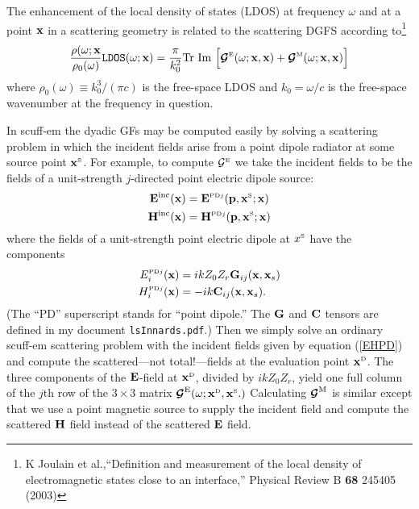 \documentclass[letterpaper]{article}
\begin{document}
The enhancement of the local density of states (LDOS)
at frequency $\omega$ and at a point $\mathbf{x}$ in a 
scattering geometry is related to the scattering DGFS according 
to\footnote{K Joulain et al.,``Definition and measurement of the local 
density of electromagnetic states close to an interface,''
Physical Review B \textbf{68} 245405 (2003)}
$$ \frac{\rho(\omega; \mathbf{x}}{\rho_0(\omega)}
   \texttt{LDOS}(\omega; \mathbf{x}) 
   = 
   \frac{\pi}{k_0^2}\text{Tr }\text{Im }
   \Big[ \boldsymbol{\mathcal{G}}^{\hbox{\tiny{E}}}(\omega; \mathbf{x}, \mathbf{x})
        +\boldsymbol{\mathcal{G}}^{\hbox{\tiny{M}}}(\omega; \mathbf{x}, \mathbf{x})
   \Big]
$$
where $\rho_0(\omega)\equiv k^3_0/(\pi c)$ is the free-space
LDOS and $k_0=\omega/c$ is the free-space wavenumber at the
frequency in question.

In {\sc scuff-em} the dyadic GFs may be computed easily by solving a
scattering problem in which the incident fields arise from a point dipole
radiator at some source point $\mathbf{x}^{\hbox{\tiny{S}}}$. For example, to compute 
$\mathcal{G}^{\hbox{\tiny{E}}}$ we take the incident fields to be the fields of a 
unit-strength $j$-directed point electric dipole source:
\begin{subequations}
\begin{align}
 \mathbf{E}^{\hbox{\scriptsize{inc}}}(\mathbf{x}) &= \mathbf{E}^{\hbox{\tiny{PD$j$}}}(\mathbf{p}, \mathbf{x}^{\hbox{\tiny{S}}}; \mathbf{x})
\\
 \mathbf{H}^{\hbox{\scriptsize{inc}}}(\mathbf{x}) &= \mathbf{H}^{\hbox{\tiny{PD$j$}}}(\mathbf{p}, \mathbf{x}^{\hbox{\tiny{S}}}; \mathbf{x})
\end{align}
\label{EHPD}
\end{subequations}
where the fields of a unit-strength point electric dipole at $x^{\hbox{\tiny{S}}}$
have the components
\begin{subequations}
\begin{align*}
 E_i^{\hbox{\tiny{PD$j$}}}(\mathbf{x}) &= ikZ_0 Z_r \mathbf{G}_{ij}(\mathbf{x}, \mathbf{x}_s) \\
 H_i^{\hbox{\tiny{PD$j$}}}(\mathbf{x}) &= -ik       \mathbf{C}_{ij}(\mathbf{x}, \mathbf{x}_s).
\end{align*}
\label{PDFields}
\end{subequations}
(The ``PD'' superscript stands for ``point dipole.'' The $\mathbf{G}$
and $\mathbf{C}$ tensors are defined in my document \texttt{lsInnards.pdf}.)
Then we simply solve an ordinary {\sc scuff-em} scattering
problem with the incident fields given by equation 
(\ref{EHPD}) and compute the scattered---not total!---fields
at the evaluation point $\mathbf{x}^{\hbox{\tiny{D}}}$. The three components of the
$\mathbf{E}$-field at $\mathbf{x}^{\hbox{\tiny{D}}}$, divided by $ikZ_0 Z_r$, yield one 
full column of the $j$th row of the 
$3\times 3$ matrix $\boldsymbol{\mathcal{G}}^{\hbox{\scriptsize{E}}}(\omega; \mathbf{x}^{\hbox{\tiny{D}}}, \mathbf{x}^{\hbox{\tiny{S}}}.)$
Calculating $\boldsymbol{\mathcal{G}}^{\hbox{\scriptsize{M}}}$ is similar except that we use 
a point magnetic source to supply the incident field 
and compute the scattered $\mathbf{H}$ field instead of the 
scattered $\mathbf{E}$ field.
\end{document}
